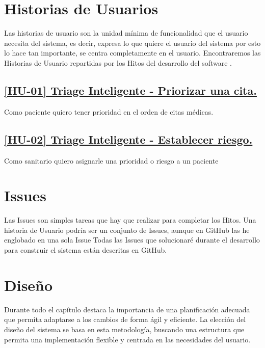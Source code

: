 \section{Historias de Usuarios}
Las historias de usuario son la unidad mínima de funcionalidad que el usuario necesita del sistema, es decir,
expresa lo que quiere el usuario del sistema por esto lo hace tan importante, se centra completamente en el
usuario. Encontraremos las Historias de Usuario repartidas por los Hitos del desarrollo del software .


\subsection*{\href{https://github.com/RubenDelgadoPareja/TFG-Triage-Inteligente-Consulta-Medica/issues/19}{[HU-01] Triage Inteligente - Priorizar una cita.}}

Como paciente quiero tener prioridad en el orden de citas médicas.

\subsection*{\href{https://github.com/RubenDelgadoPareja/TFG-Triage-Inteligente-Consulta-Medica/issues/5}{[HU-02] Triage Inteligente - Establecer riesgo.}}

Como sanitario quiero asignarle una prioridad o riesgo a un paciente

\section{Issues}
Las Issues son simples tareas que hay que realizar para completar los Hitos.
Una historia de Usuario podría ser un conjunto de Issues, aunque en GitHub las he englobado en una sola Issue
Todas las Issues que solucionaré durante el desarrollo para construir el sistema están descritas en GitHub.

\section{Diseño}
Durante todo el capítulo destaca la importancia de una planificación adecuada que permita adaptarse a los cambios de forma ágil y eficiente.
La elección del diseño del sistema se basa en esta metodología, buscando una estructura que permita una implementación flexible y centrada en las necesidades del usuario.

